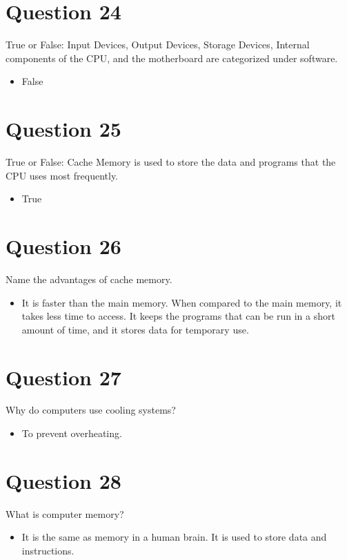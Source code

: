 \documentclass{article}
\begin{document}
\section*{Question 24}
True or False: Input Devices, Output Devices, Storage Devices, Internal components of the CPU, and the motherboard are categorized under software.
\begin{itemize}[label=\alph*.]
    \item False
\end{itemize}

\section*{Question 25}
True or False: Cache Memory is used to store the data and programs that the CPU uses most frequently.
\begin{itemize}[label=\alph*.]
    \item True
\end{itemize}

\section*{Question 26}
Name the advantages of cache memory.
\begin{itemize}[label=\alph*.]
    \item It is faster than the main memory. When compared to the main memory, it takes less time to access. It keeps the programs that can be run in a short amount of time, and it stores data for temporary use.
\end{itemize}

\section*{Question 27}
Why do computers use cooling systems?
\begin{itemize}[label=\alph*.]
    \item To prevent overheating.
\end{itemize}

\section*{Question 28}
What is computer memory?
\begin{itemize}[label=\alph*.]
    \item It is the same as memory in a human brain. It is used to store data and instructions.
\end{itemize}
\end{document}

